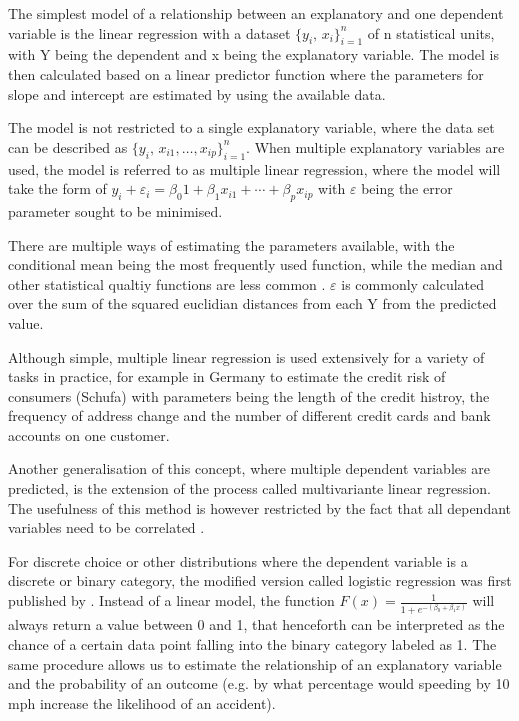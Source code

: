  
The simplest model of a relationship between an explanatory and one dependent variable is the linear regression with a dataset ${\displaystyle \{y_{i},\,x_{i}\}_{i=1}^{n}}$ of n statistical units, with Y being the dependent and x being the explanatory variable.
The model is then calculated based on a linear predictor function where the parameters for slope and intercept are estimated by using the available data.
 
The model is not restricted to a single explanatory variable, where the data set can be described as  ${\displaystyle \{y_{i},\,x_{i1},\ldots ,x_{ip}\}_{i=1}^{n}}$. When multiple explanatory variables are used, the model is referred to as multiple linear regression, where the model will take the form of ${ y_{i} +\varepsilon _{i} =\beta _{0}1+\beta _{1}x_{i1}+\cdots +\beta _{p}x_{ip}}$ with $\varepsilon$ being the error parameter sought to be minimised.

There are multiple ways of estimating the parameters available, with the conditional mean being the most frequently used function, while the median and other statistical qualtiy functions are less common \cite{Yan:2009:LRA:1717831}.  $\varepsilon$ is commonly calculated over the sum of the squared euclidian distances from each Y from the predicted value.


Although simple, multiple linear regression is used extensively for a variety of tasks in practice, for example in Germany to estimate the credit risk of consumers (Schufa) with parameters being the length of the credit histroy, the frequency of address change and the number of different credit cards and bank accounts on one customer. %


Another generalisation of this concept, where multiple dependent variables are predicted, is the extension of the process called multivariante linear regression. The usefulness of this method is however restricted by the fact that all dependant variables need to be correlated \cite{Yan:2009:LRA:1717831}.


For discrete choice or other distributions where the dependent variable is a discrete or binary category, the modified version called logistic regression was first published by \cite{cox58reg}. Instead of a linear model, the  function ${\displaystyle F(x)={\frac {1}{1+e^{-(\beta _{0}+\beta _{1}x)}}}}$ will always return a value between 0 and 1, that henceforth can be interpreted as the chance of a certain data point falling into the binary category labeled as 1. The same procedure allows us to estimate the relationship of an explanatory variable and the probability of an outcome (e.g. by what percentage would speeding by 10 mph increase the likelihood of an accident).

